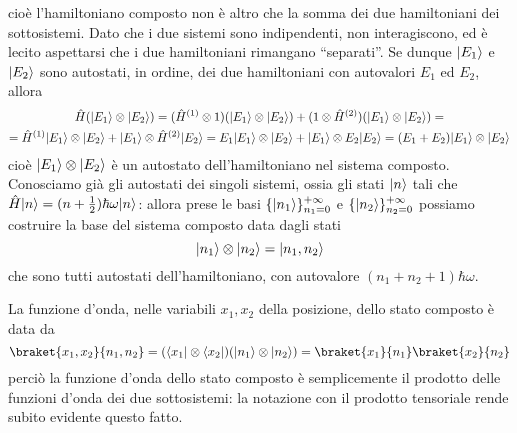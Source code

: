 cioè l'hamiltoniano composto non è altro che la somma dei due hamiltoniani dei sottosistemi.
Dato che i due sistemi sono indipendenti, non interagiscono, ed è lecito aspettarsi che i due hamiltoniani rimangano ``separati''.
Se dunque $\lvert E_1\rangle$ e $\lvert E_2\rangle$ sono autostati, in ordine, dei due hamiltoniani con autovalori $E_1$ ed $E_2$, allora
\begin{multline}
	\hat{H}(\lvert E_1\rangle\otimes\lvert E_2\rangle)=
	(\hat{H}^{(1)}\otimes 1)(\lvert E_1\rangle\otimes\lvert E_2\rangle)+(1\otimes\hat{H}^{(2)})(\lvert E_1\rangle\otimes\lvert E_2\rangle)=\\=
	\hat{H}^{(1)}\lvert E_1\rangle\otimes\lvert E_2\rangle+\lvert E_1\rangle\otimes\hat{H}^{(2)}\lvert E_2\rangle=E_1\lvert E_1\rangle\otimes\lvert E_2\rangle+\lvert E_1\rangle\otimes E_2\lvert E_2\rangle=(E_1+E_2)\lvert E_1\rangle\otimes\lvert E_2\rangle
\end{multline}
cioè $\lvert E_1\rangle\otimes\lvert E_2\rangle$ è un autostato dell'hamiltoniano nel sistema composto.
Conosciamo già gli autostati dei singoli sistemi, ossia gli stati $\lvert n\rangle$ tali che $\hat{H}\lvert n\rangle=(n+\frac12)\hbar\omega\lvert n\rangle$: allora prese le basi $\{\lvert n_1\rangle\}_{n_1=0}^{+\infty}$ e $\{\lvert n_2\rangle\}_{n_2=0}^{+\infty}$ possiamo costruire la base del sistema composto data dagli stati
\begin{equation}
	\lvert n_1\rangle\otimes\lvert n_2\rangle=\lvert n_1,n_2\rangle
\end{equation}
che sono tutti autostati dell'hamiltoniano, con autovalore $(n_1+n_2+1)\hbar\omega$.

La funzione d'onda, nelle variabili $x_1,x_2$ della posizione, dello stato composto è data da 
\begin{equation}
	\braket{x_1,x_2}{n_1,n_2}=(\bra{x_1}\otimes\bra{x_2})(\ket{n_1}\otimes\ket{n_2})=\braket{x_1}{n_1}\braket{x_2}{n_2}
\end{equation}
perciò la funzione d'onda dello stato composto è semplicemente il prodotto delle funzioni d'onda dei due sottosistemi: la notazione con il prodotto tensoriale rende subito evidente questo fatto.


